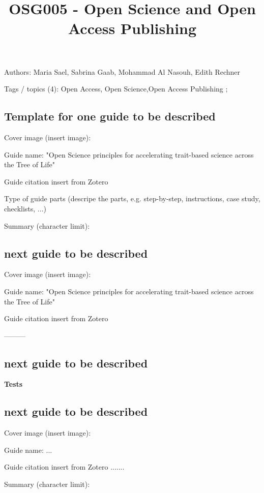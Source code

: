 \documentclass{article}
\begin{document}
\title{OSG005 - Open Science and Open Access Publishing }

\maketitle





Authors:  Maria Sael, Sabrina Gaab, Mohammad Al Nasouh, Edith Rechner


Tags / topics (4): Open Access, Open Science,Open Access Publishing ; 


\subsection{Template for one guide to be described}\label{H7151279}



Cover image (insert image): 


Guide name: "Open Science principles for accelerating trait-based science across the Tree of Life"


Guide citation insert from Zotero  \autocite{gallagher_open_2020}


Type of guide parts (descripe the parts, e.g. step-by-step, instructions, case study, checklists, ...)


Summary (character limit): 


\autocite{open-accessnet_platform_open_nodate} 


\subsection{next guide to be described}\label{H7212092}



Cover image (insert image):


Guide name: "Open Science principles for accelerating trait-based science across the Tree of Life"


Guide citation insert from Zotero  \autocite{gallagher_open_2020}


---------


\subsection{next guide to be described}\label{H8053929}



\textbf{Tests}


\subsection{next guide to be described}\label{H1144211}



Cover image (insert image):


Guide name: ...


Guide citation insert from Zotero .......


Summary (character limit): 





\printbibliography[title={Literaturverzeichnis}]
\end{document}
